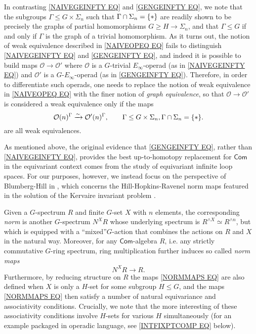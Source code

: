 \documentclass[a4paper,10pt
,draft
]{article}%
\numberwithin{equation}{section}
\numberwithin{figure}{section}
\theoremstyle{definition} %
\renewcommand{\O}{\ensuremath{\mathcal O}}
\newcommand{\1}{\ensuremath{\mathbbm 1}}%
\begin{document}
In contrasting 
\eqref{NAIVEGEINFTY EQ} and \eqref{GENGEINFTY EQ},
we note that 
the subgroups $\Gamma \leq G \times \Sigma_n$ such that $\Gamma \cap \Sigma_n = \{\**\}$ 
are readily shown to be precisely the graphs of partial homomorphisms 
$G \geq H \to \Sigma_n$,
and that $\Gamma \leq G$ if and only if $\Gamma$ is the graph of a trivial homomorphism. 
As it turns out, the notion of weak equivalence described in \eqref{NAIVEOPEQ EQ} fails to distinguish
\eqref{NAIVEGEINFTY EQ} and \eqref{GENGEINFTY EQ}, 
and indeed it is possible
to build maps $\O \to \O'$ where
$\O$ is a $G$-trivial $E_{\infty}$-operad (as in \eqref{NAIVEGEINFTY EQ})
and $\O'$ is a $G$-$E_{\infty}$-operad 
(as in \eqref{GENGEINFTY EQ}).
Therefore, in order to differentiate such operads, one needs to replace the notion of weak equivalence in \eqref{NAIVEOPEQ EQ} 
with the finer notion of \textit{graph equivalence}, 
so that $\O \to \O'$ is considered a weak equivalence only if
the maps
\begin{equation}\label{GENEOPEQ EQ}
	\O(n)^{\Gamma} \xrightarrow{\sim} \O'(n)^{\Gamma}, \qquad
	\Gamma \leq G\times \Sigma_n, \Gamma \cap \Sigma_n = \{\**\}.
\end{equation}
are all weak equivalences.

As mentioned above, the original evidence \cite{CW91}
that \eqref{GENGEINFTY EQ}, 
rather than \eqref{NAIVEGEINFTY EQ}, 
provides the best up-to-homotopy replacement for $\mathsf{Com}$ in the equivariant context comes from the study of equivariant infinite loop spaces. %
For our purposes, however, we instead focus on the perspective of Blumberg-Hill in \cite{BH15},
which concerns the Hill-Hopkins-Ravenel norm maps featured in the solution of the Kervaire invariant problem \cite{HHR}.

Given a $G$-spectrum $R$ and finite $G$-set $X$ with $n$ elements, 
the corresponding \textit{norm} is another $G$-spectrum $N^X R$
whose underlying spectrum is 
$R^{\wedge X} \simeq R^{\wedge n}$,
but which is equipped with a ``mixed''$G$-action that combines the actions on $R$ and $X$ in the natural way.
Moreover, for any $\mathsf{Com}$-algebra $R$, i.e.
any strictly commutative $G$-ring spectrum, 
ring multiplication further induces so called \textit{norm maps}
\begin{equation}\label{NORMMAPS EQ}
	N^X R \to R.
\end{equation}
Furthermore, by reducing structure on $R$ the maps \eqref{NORMMAPS EQ} are also defined when $X$ is only a $H$-set for some subgroup $H \leq G$, and the maps \eqref{NORMMAPS EQ}
then satisfy a number of 
natural equivariance and associativity conditions.
Crucially,  we note that the more interesting of these associativity conditions involve $H$-sets for various $H$ simultaneously
(for an example packaged in operadic language,
see \eqref{INTFIXPTCOMP EQ} below).
\end{document}
